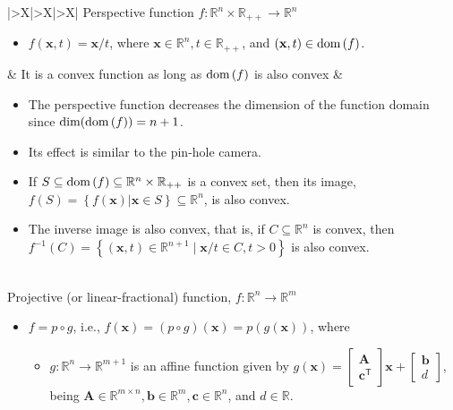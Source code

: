 \documentclass{article}
\newcommand{\dom}[1]{\ensuremath{\textnormal{dom}\left(#1\right)}} %
\begin{document}
\begin{xltabular}{\textwidth}{|>{\setlength\hsize{1\hsize}\setlength\linewidth{\hsize}}X|>{\setlength\hsize{.9\hsize}\setlength\linewidth{\hsize}}X|>{\setlength\hsize{1.1\hsize}\setlength\linewidth{\hsize}}X|}
	\hline
	\hline
	Perspective function \(f: \mathbb{R}^{n} \times \mathbb{R}_{++} \rightarrow \mathbb{R}^{n}\)
	\begin{itemize}[leftmargin=*]
		\item \(f(\mathbf{x}, t) = \mathbf{x}/t\), where \(\mathbf{x} \in \mathbb{R}^{n}, t \in \mathbb{R}_{++}\), and \((\mathbf{x}, t) \in \dom{f}\).
	\end{itemize}
	& It is a convex function as long as \(\dom{f}\) is also convex & \vspace{-3.5ex} \begin{itemize}[leftmargin=*]
		\item The perspective function decreases the dimension of the function domain since \(\textnormal{dim}(\dom{f}) = n+1\).
		\item Its effect is similar to the pin-hole camera.
		\item If \(S \subseteq \dom{f} \subseteq \mathbb{R}^{n} \times \mathbb{R}_{++}\) is a convex set, then its image, \(f(S) = \left\{ f(\mathbf{x})|\mathbf{x}\in S \right\} \subseteq \mathbb{R}^{n}\), is also convex.
		\item The inverse image is also convex, that is, if \(C \subseteq \mathbb{R}^{n}\) is convex, then \(f^{-1}(C) = \left\{ (\mathbf{x}, t) \in \mathbb{R}^{n+1} \mid \mathbf{x}/t \in C, t>0 \right\}\) is also convex.
	\end{itemize} \\
	\hline
	Projective (or linear-fractional) function, \(f: \mathbb{R}^{n} \rightarrow \mathbb{R}^{m}\)
	\begin{itemize}[leftmargin=*]
		\item \(f = p \circ g\), i.e., \(f(\mathbf{x}) = (p\circ g)(\mathbf{x}) = p(g(\mathbf{x}))\), where
		      \begin{itemize}[label={$\triangleright$}]
			      \item \(g: \mathbb{R}^{n} \rightarrow \mathbb{R}^{m+1}\) is an affine function given by \(g(\mathbf{x}) = \begin{bmatrix}
				            \mathbf{A} \\
				            \mathbf{c}^\mathsf{T}
			            \end{bmatrix} \mathbf{x} + \begin{bmatrix}
				            \mathbf{b} \\
				            d
			            \end{bmatrix}\), being \(\mathbf{A}\in \mathbb{R}^{m \times n}, \mathbf{b} \in \mathbb{R}^{m}, \mathbf{c} \in \mathbb{R}^{n}\), and \(d \in \mathbb{R}\).

\end{itemize}
\end{itemize}
\end{xltabular}
\end{document}
